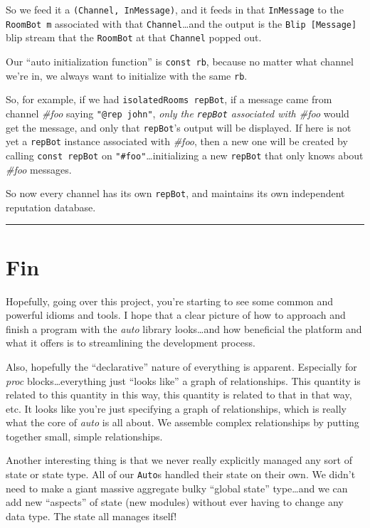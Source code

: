 \documentclass[]{article}
\begin{document}
So we feed it a \texttt{(Channel,\ InMessage)}, and it feeds in that
\texttt{InMessage} to the \texttt{RoomBot\ m} associated with that
\texttt{Channel}\ldots{}and the output is the
\texttt{Blip\ {[}Message{]}} blip stream that the \texttt{RoomBot} at
that \texttt{Channel} popped out.

Our ``auto initialization function'' is \texttt{const\ rb}, because no
matter what channel we're in, we always want to initialize with the same
\texttt{rb}.

So, for example, if we had \texttt{isolatedRooms\ repBot}, if a message
came from channel \emph{\#foo} saying \texttt{"@rep\ john"}, \emph{only
the \texttt{repBot} associated with \#foo} would get the message, and
only that \texttt{repBot}'s output will be displayed. If here is not yet
a \texttt{repBot} instance associated with \emph{\#foo}, then a new one
will be created by calling \texttt{const\ repBot} on
\texttt{"\#foo"}\ldots{}initializing a new \texttt{repBot} that only
knows about \emph{\#foo} messages.

So now every channel has its own \texttt{repBot}, and maintains its own
independent reputation database.

\begin{center}\rule{0.5\linewidth}{\linethickness}\end{center}

\section{Fin}\label{fin}

Hopefully, going over this project, you're starting to see some common
and powerful idioms and tools. I hope that a clear picture of how to
approach and finish a program with the \emph{auto} library
looks\ldots{}and how beneficial the platform and what it offers is to
streamlining the development process.

Also, hopefully the ``declarative'' nature of everything is apparent.
Especially for \emph{proc} blocks\ldots{}everything just ``looks like''
a graph of relationships. This quantity is related to this quantity in
this way, this quantity is related to that in that way, etc. It looks
like you're just specifying a graph of relationships, which is really
what the core of \emph{auto} is all about. We assemble complex
relationships by putting together small, simple relationships.

Another interesting thing is that we never really explicitly managed any
sort of state or state type. All of our \texttt{Auto}s handled their
state on their own. We didn't need to make a giant massive aggregate
bulky ``global state'' type\ldots{}and we can add new ``aspects'' of
state (new modules) without ever having to change any data type. The
state all manages itself!
\end{document}
